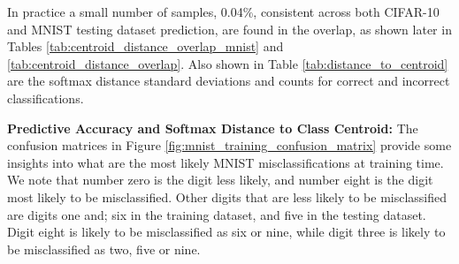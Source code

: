 In practice a small number of samples, 0.04\%, consistent across both CIFAR-10 and MNIST testing dataset prediction, are found in the overlap, as shown later in Tables \ref{tab:centroid_distance_overlap_mnist} and \ref{tab:centroid_distance_overlap}. Also shown in Table \ref{tab:distance_to_centroid} are the softmax distance standard deviations and counts for correct and incorrect classifications.


\noindent \textbf{Predictive Accuracy and Softmax Distance to Class Centroid:} The confusion matrices in Figure \ref{fig:mnist_training_confusion_matrix} provide some insights into what are the most likely MNIST misclassifications at training time. We note that number zero is the digit less likely, and number eight is the digit most likely to be misclassified. Other digits that are less likely to be misclassified are digits one and; six in the training dataset, and five in the testing dataset. Digit eight is likely to be misclassified as six or nine, while digit three is likely to be misclassified as two, five or nine.



